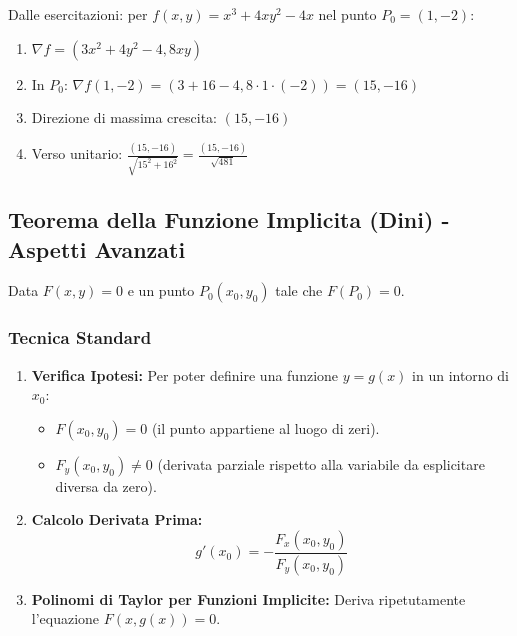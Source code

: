 \begin{esempio}
Dalle esercitazioni: per $f(x,y) = x^3 + 4xy^2 - 4x$ nel punto $P_0 = (1,-2)$:

\begin{enumerate}
    \item $\nabla f = (3x^2 + 4y^2 - 4, 8xy)$
    \item In $P_0$: $\nabla f(1,-2) = (3 + 16 - 4, 8 \cdot 1 \cdot (-2)) = (15, -16)$
    \item Direzione di massima crescita: $(15, -16)$
    \item Verso unitario: $\frac{(15,-16)}{\sqrt{15^2 + 16^2}} = \frac{(15,-16)}{\sqrt{481}}$
\end{enumerate}
\end{esempio}

\subsection{Teorema della Funzione Implicita (Dini) - Aspetti Avanzati}
Data $F(x,y)=0$ e un punto $P_0(x_0,y_0)$ tale che $F(P_0)=0$. 

\subsubsection{Tecnica Standard}
\begin{enumerate}
    \item \textbf{Verifica Ipotesi:} Per poter definire una funzione $y=g(x)$ in un intorno di $x_0$:
    \begin{itemize}
        \item $F(x_0, y_0) = 0$ (il punto appartiene al luogo di zeri). 
        \item $F_y(x_0,y_0) \neq 0$ (derivata parziale rispetto alla variabile da esplicitare diversa da zero). 
    \end{itemize}
    \item \textbf{Calcolo Derivata Prima:}
    \[ g'(x_0) = -\frac{F_x(x_0,y_0)}{F_y(x_0,y_0)} \]
    \item \textbf{Polinomi di Taylor per Funzioni Implicite:} Deriva ripetutamente l'equazione $F(x,g(x)) = 0$.
\end{enumerate}

